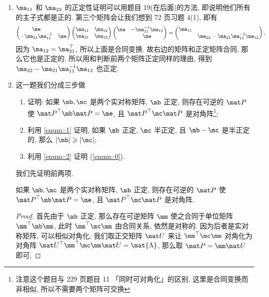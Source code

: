 \begin{solution}
\begin{enumerate}
    \item $\ma_{11}$ 和 $\ma_{22}$ 的正定性证明可以用题目 19(在后面)的方法, 即说明他们所有的主子式都是正的. 第三个矩阵会让我们想到 72 页习题 4(1), 即有
    \[
    \begin{pmatrix}
        \me &  \\
        -\ma_{21}\ma_{11}^{-1} & \me
    \end{pmatrix}
    \begin{pmatrix}
        \ma_{11} & \ma_{12} \\
        \ma_{21} & \ma_{22}
    \end{pmatrix}
    \begin{pmatrix}
        \me & -\ma_{11}^{-1} \ma_{12} \\
         & \me
    \end{pmatrix} = 
    \begin{pmatrix}
        \ma_{11} & \\
        & \ma_{22} - \ma_{21}\ma_{11}^{-1}\ma_{12}
    \end{pmatrix},
    \]
    因为 $\ma_{12} = \ma_{21}^\top$, 所以上面是合同变换. 故右边的矩阵和正定矩阵合同, 那么它也是正定的. 所以用和判断前两个矩阵正定同样的理由, 得到 $\ma_{22} - \ma_{21}\ma_{11}^{-1}\ma_{12}$ 也正定.
    \item 这一题我们分成三步做
    \begin{enumerate}[label=\alph*)]
        \item\label{enum::1} 证明: 如果 $\mb, \mc$ 是两个实对称矩阵, $\mb$ 正定, 则存在可逆的 $\mpp$ 使 $\quadform{\mpp}{\mb}= \me$, 且 $\quadform{\mpp}{\mc}$ 是对角阵\footnote{注意这个题目与 229 页题目 11 「同时可对角化」的区别, 这里是合同变换而非相似, 所以不需要两个矩阵可交换};
        \item\label{enum::2} 利用 \ref{enum::1} 证明, 如果 $\mb$ 正定, $\mc$ 半正定, 且 $\mb - \mc$ 是半正定的, 那么 $|\mb| \geqslant |\mc|$;
        \item 利用 \ref{enum::2} 证明 (\ref{enum::0}).
    \end{enumerate}
    我们先证明前两项.
    \begin{lemma}\label{lemma::1}
        如果 $\mb, \mc$ 是两个实对称矩阵, $\mb$ 正定, 则存在可逆的 $\mpp$ 使 $\quadform{\mpp}{\mb}= \me$, 且 $\quadform{\mpp}{\mc}$ 是对角阵.
    \end{lemma}
    \begin{proof}
        首先由于 $\mb$ 正定, 那么存在可逆矩阵 $\mm$ 使之合同于单位矩阵 $\quadform{\mm}{\mb}$, 此时 $\quadform{\mm}{\mc}$ 由合同关系, 依然是对称的. 因为后者是实对称矩阵, 可以相似对角化, 我们取正交矩阵 $\muu$ 来让 $\quadform{\mm}{\mc}$ 对角化为对角阵 $\muu^\top \quadform{\mm}{\mc} \muu = \mat{\Lambda}$, 那么取 $\mpp = \mm \muu$ 即可,

\end{proof}
\end{enumerate}
\end{solution}
